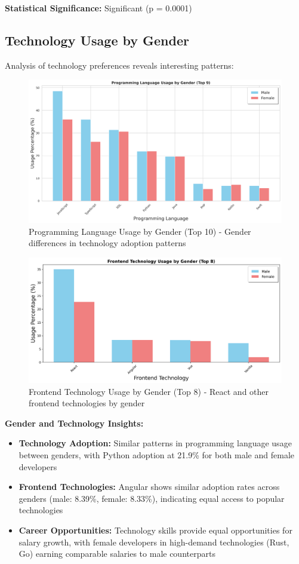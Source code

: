 \documentclass[12pt,a4paper]{article}
\begin{document}
\textbf{Statistical Significance:} Significant (p = 0.0001)

\subsection{Technology Usage by Gender}
Analysis of technology preferences reveals interesting patterns:

\begin{figure}[H]
    \centering
    \includegraphics[width=\textwidth]{figures/barplot_gender_programming.png}
    \caption{Programming Language Usage by Gender (Top 10) - Gender differences in technology adoption patterns}
\end{figure}

\begin{figure}[H]
    \centering
    \includegraphics[width=\textwidth]{figures/barplot_gender_frontend.png}
    \caption{Frontend Technology Usage by Gender (Top 8) - React and other frontend technologies by gender}
\end{figure}

\textbf{Gender and Technology Insights:}
\begin{itemize}
    \item \textbf{Technology Adoption:} Similar patterns in programming language usage between genders, with Python adoption at 21.9\% for both male and female developers
    \item \textbf{Frontend Technologies:} Angular shows similar adoption rates across genders (male: 8.39\%, female: 8.33\%), indicating equal access to popular technologies
    \item \textbf{Career Opportunities:} Technology skills provide equal opportunities for salary growth, with female developers in high-demand technologies (Rust, Go) earning comparable salaries to male counterparts
\end{itemize}
\end{document}
